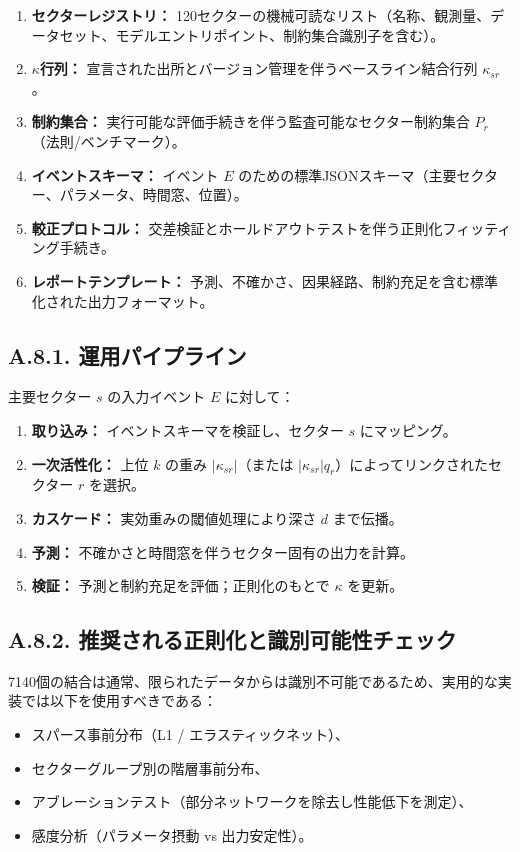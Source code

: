 \documentclass[13pt,a4paper]{ltjsarticle}
\begin{document}
	\begin{enumerate}[leftmargin=*]
		\item \textbf{セクターレジストリ：} 120セクターの機械可読なリスト（名称、観測量、データセット、モデルエントリポイント、制約集合識別子を含む）。
		\item \textbf{$\kappa$行列：} 宣言された出所とバージョン管理を伴うベースライン結合行列 $\kappa_{sr}$。
		\item \textbf{制約集合：} 実行可能な評価手続きを伴う監査可能なセクター制約集合 $P_r$（法則/ベンチマーク）。
		\item \textbf{イベントスキーマ：} イベント $E$ のための標準JSONスキーマ（主要セクター、パラメータ、時間窓、位置）。
		\item \textbf{較正プロトコル：} 交差検証とホールドアウトテストを伴う正則化フィッティング手続き。
		\item \textbf{レポートテンプレート：} 予測、不確かさ、因果経路、制約充足を含む標準化された出力フォーマット。
	\end{enumerate}
	
	\subsection*{A.8.1. 運用パイプライン}
	主要セクター $s$ の入力イベント $E$ に対して：
	\begin{enumerate}[leftmargin=*]
		\item \textbf{取り込み：} イベントスキーマを検証し、セクター $s$ にマッピング。
		\item \textbf{一次活性化：} 上位 $k$ の重み $|\kappa_{sr}|$（または $|\kappa_{sr}|q_r$）によってリンクされたセクター $r$ を選択。
		\item \textbf{カスケード：} 実効重みの閾値処理により深さ $d$ まで伝播。
		\item \textbf{予測：} 不確かさと時間窓を伴うセクター固有の出力を計算。
		\item \textbf{検証：} 予測と制約充足を評価；正則化のもとで $\kappa$ を更新。
	\end{enumerate}
	
	\subsection*{A.8.2. 推奨される正則化と識別可能性チェック}
	7140個の結合は通常、限られたデータからは識別不可能であるため、実用的な実装では以下を使用すべきである：
	\begin{itemize}[leftmargin=*]
		\item スパース事前分布（L1 / エラスティックネット）、
		\item セクターグループ別の階層事前分布、
		\item アブレーションテスト（部分ネットワークを除去し性能低下を測定）、
		\item 感度分析（パラメータ摂動 vs 出力安定性）。
	\end{itemize}
	
\end{document}
